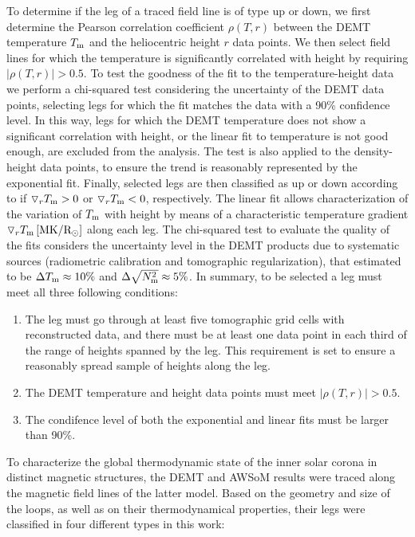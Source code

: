 \documentclass[namedreferences]{solarphysics}
\newcommand{\mrsun}{{\rm R_\odot}}
\newcommand{\MK}{{\rm MK}}
\newcommand{\dr}{\triangledown_r}
\newcommand{\Tm}{T_{\rm m}}
\newcommand{\Nsqm}{N^2_{{\rm m}}}
\newcommand{\rhoTr}{\rho(T,r)}
\newcommand{\sqravgN}{\sqrt{\Nsqm}}
\begin{document}
\begin{article}
{To determine if the leg of a traced field line is} of type up or down, we first determine the Pearson correlation coefficient $\rhoTr$ between the DEMT temperature $\Tm$ and the heliocentric height $r$ data points. We then select field lines for which the temperature {is significantly correlated with height} by requiring $|\rhoTr| > 0.5$. {To test the goodness of the fit to the temperature-height data we perform a chi-squared test \citep{recipes} considering the uncertainty of the DEMT data points, selecting legs for which the fit matches the data with a 90\% confidence level.} In this way, legs for which the DEMT temperature does not show a significant {correlation} with height, or the linear fit to temperature is {not} good enough, are {excluded from the} analysis. {The test is also applied to the density-height data points, to ensure the trend is reasonably represented by the exponential fit.} Finally, selected legs are then classified as up or down according to if $\dr\Tm > 0$ or $\dr\Tm < 0$, respectively. The linear fit allows characterization of the variation of $\Tm$ with height by means of a characteristic temperature gradient $\dr \Tm\,[\MK/\mrsun]$ along each leg. {The chi-squared test to evaluate the quality of the fits considers the uncertainty level in the DEMT products due to systematic sources (radiometric calibration and tomographic regularization), that \citet{lloveras_2017} estimated to be $\Delta\Tm\approx 10\%$ and $\Delta\sqravgN\approx 5\%$.} In summary, to be selected a leg must meet all three following conditions:

\begin{enumerate}
\item 
The leg must go through at least five tomographic grid cells with reconstructed data, and there must be at least one data point in each third of the range of heights spanned by the leg. {This requirement is set to ensure a reasonably spread sample of heights along the leg.}
\item 
The {DEMT temperature and height data points must meet} $|\rhoTr| > 0.5$.
\item 
{The condifence level of both the exponential and linear fits must be larger than 90\%.} 
\end{enumerate}

{To characterize the global thermodynamic state of the inner solar corona in distinct magnetic structures, the DEMT and AWSoM results were traced along the magnetic field lines of the latter model. Based on the geometry and size of the loops, as well as on their thermodynamical properties, their legs were classified in four different types in this work:} 


\end{article}
\end{document}
